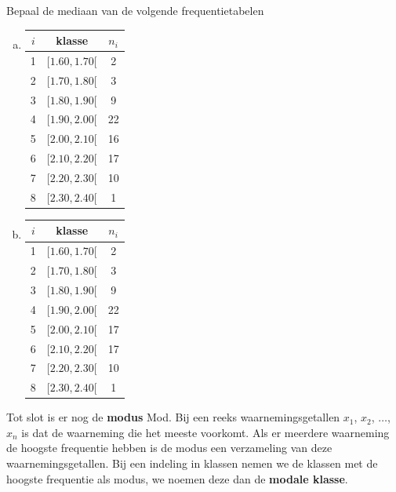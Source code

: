 \documentclass[12pt,twoside,a4paper]{article}
\begin{document}
\begin{oefening}
Bepaal de mediaan van de volgende frequentietabelen
\begin{multicols}{2}
\begin{enumerate}[(a)]
  \item
  \begin{center}
\begin{tabular}{c|c|c}
$i$ & klasse     & $n_i$\\
\hline
  1 & $[ 1.60,  1.70[$ &   2\\
  2 & $[ 1.70,  1.80[$ &   3\\
  3 & $[ 1.80,  1.90[$ &   9\\
  4 & $[ 1.90,  2.00[$ &   22\\
  5 & $[ 2.00,  2.10[$ &   16\\
  6 & $[ 2.10,  2.20[$ &   17\\
  7 & $[ 2.20,  2.30[$ &   10\\
  8 & $[ 2.30,  2.40[$ &   1\\
\end{tabular}
\end{center}
  \item
  \begin{center}
\begin{tabular}{c|c|c}
$i$ & klasse     & $n_i$\\
\hline
  1 & $[ 1.60,  1.70[$ &   2\\
  2 & $[ 1.70,  1.80[$ &   3\\
  3 & $[ 1.80,  1.90[$ &   9\\
  4 & $[ 1.90,  2.00[$ &   22\\
  5 & $[ 2.00,  2.10[$ &   17\\
  6 & $[ 2.10,  2.20[$ &   17\\
  7 & $[ 2.20,  2.30[$ &   10\\
  8 & $[ 2.30,  2.40[$ &   1\\
\end{tabular}
\end{center}
\end{enumerate}
\end{multicols}
\end{oefening}

Tot slot is er nog de {\bf modus} Mod. Bij een reeks waarnemingsgetallen $x_1$, $x_2$, $\ldots$, $x_n$ is dat de waarneming die het meeste voorkomt. Als er meerdere waarneming de hoogste frequentie hebben is de modus een verzameling van deze waarnemingsgetallen. Bij een indeling in klassen nemen we de klassen met de hoogste frequentie als modus, we noemen deze dan de {\bf modale klasse}.
\end{document}
